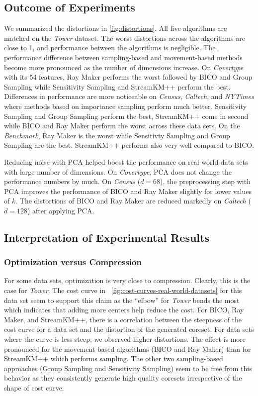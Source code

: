 \subsection{Outcome of Experiments}
We summarized the distortions in \cref{fig:distortions}.
All five algorithms are matched on the \textit{Tower} dataset. The worst distortions across the algorithms are close to 1, and performance between the algorithms is negligible. The performance difference between sampling-based and movement-based methods become more pronounced as the number of dimensions increase. On \textit{Covertype} with its 54 features, Ray Maker performs the worst followed by BICO and Group Sampling while Sensitivity Sampling and StreamKM++ perform the best. Differences in performance are more noticeable on \textit{Census}, \textit{Caltech}, and \textit{NYTimes}  where methods based on importance sampling perform much better. Sensitivity Sampling and Group Sampling perform the best, StreamKM++ come in second while BICO and Ray Maker perform the worst across these data sets.
On the \textit{Benchmark}, Ray Maker is the worst while Sensitivty Sampling and Group Sampling are the best. StreamKM++ performs also very well compared to BICO.

Reducing noise with PCA helped boost the performance on real-world data sets with large number of dimensions. On \textit{Covertype}, PCA does not change the performance numbers by much. On \textit{Census} ($d=68$), the preprocessing step with PCA improves the performance of BICO and Ray Maker slightly for lower values of $k$. The distortions of BICO and Ray Maker are reduced markedly on \textit{Caltech} ($d=128$) after applying PCA. 


\subsection{Interpretation of Experimental Results}


\subsubsection*{Optimization versus Compression}
For some data sets, optimization is very close to compression. 
Clearly, this is the case for \textit{Tower}. The cost curve in ~\cref{fig:cost-curves-real-world-datasets} for this data set seem to support this claim as the ``elbow'' for \textit{Tower} bends the most which indicates that adding more centers help reduce the cost. For BICO, Ray Maker, and StreamKM++, there is a correlation between the steepness of the cost curve for a data set and the distortion of the generated coreset. For data sets where the curve is less steep, we observed higher distortions. The effect is more pronounced for the movement-based algorithms (BICO and Ray Maker) than for StreamKM++ which performs sampling. The other two sampling-based approaches (Group Sampling and Sensitivity Sampling) seem to be free from this behavior as they consistently generate high quality coresets irrespective of the shape of cost curve.

